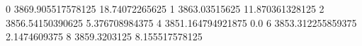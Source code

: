 0 3869.905517578125 18.74072265625
1 3863.03515625 11.870361328125
2 3856.54150390625 5.376708984375
4 3851.164794921875 0.0
6 3853.312255859375 2.1474609375
8 3859.3203125 8.155517578125
